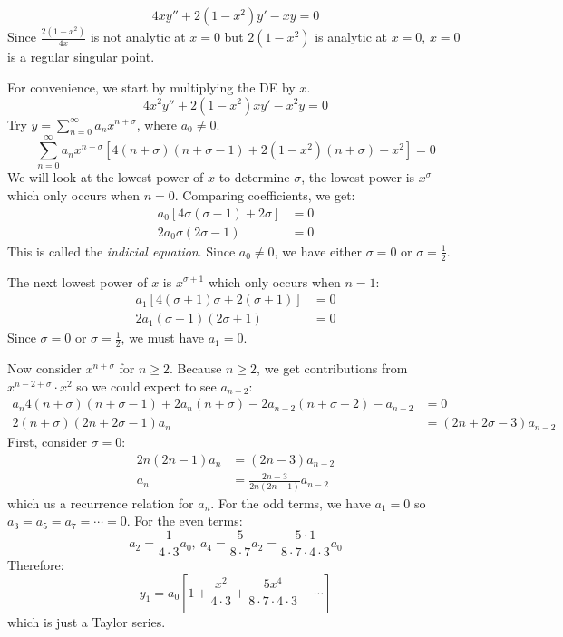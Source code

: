 \documentclass[../main.tex]{subfiles}
\begin{document}
\begin{example}
  \label{regSPEx}
  \[
    4xy'' + 2(1 - x^2)y' - xy = 0
  \]
  Since $\frac{2(1-x^2)}{4x}$ is not analytic at $x = 0$ but $2(1-x^2)$ is analytic at $x = 0$, $x = 0$ is a regular singular point.

  For convenience, we start by multiplying the DE by $x$.
  \[
    4x^2y'' + 2(1 - x^2)xy' - x^2y = 0
  \]
  Try $y=\sum_{n=0}^{\infty} a_n x^{n + \sigma}$, where $a_0 \neq 0$.
  \[
    \sum_{n=0}^{\infty} a_nx^{n + \sigma}[4\left(n + \sigma\right)(n + \sigma - 1) + 2(1-x^2)(n + \sigma) - x^2] = 0
  \]
  We will look at the lowest power of $x$ to determine $\sigma$, the lowest power is $x^{\sigma}$ which only occurs when $n = 0$.
  Comparing coefficients, we get:
  \begin{align*}
    a_0[4\sigma(\sigma - 1) + 2\sigma] &= 0  \\
    2a_0\sigma(2\sigma - 1) &= 0
  \end{align*}
  This is called the \textit{indicial equation}.
  Since $a_0 \neq 0$, we have either $\sigma = 0$ or $\sigma = \frac{1}{2}$.

  The next lowest power of $x$ is $x^{\sigma + 1}$ which only occurs when $n = 1$:
  \begin{align*}
    a_1 [4(\sigma + 1)\sigma + 2(\sigma + 1)] &= 0 \\
    2a_1(\sigma + 1) (2\sigma  + 1) &= 0
  \end{align*}
  Since $\sigma = 0$ or $\sigma = \frac{1}{2}$, we must have $a_1 = 0$.

  Now consider $x^{n + \sigma}$ for $n \geq 2$.
  Because $n \geq 2$, we get contributions from $x^{n - 2 + \sigma} \cdot x^2$ so we could expect to see $a_{n-2}$:
  \begin{align*}
    a_n4(n + \sigma)(n + \sigma - 1) + 2a_n(n + \sigma) - 2a_{n - 2}(n + \sigma - 2)- a_{n - 2} &= 0 \\
    2(n + \sigma)(2n + 2\sigma - 1)a_n &= (2n + 2\sigma - 3)a_{n - 2}
  \end{align*}
  First, consider $\sigma = 0$:
  \begin{align*}
    2n(2n - 1)a_n &= (2n - 3)a_{n -2} \\
    a_n &= \frac{2n - 3}{2n(2n -1)}a_{n-2}
  \end{align*}
  which us a recurrence relation for $a_n$.
  For the odd terms, we have $a_1 = 0$ so $a_3 = a_5 = a_7 = \cdots = 0$.
  For the even terms:
  \[
    a_2 = \frac{1}{4 \cdot 3}a_0,\ a_4 = \frac{5}{8 \cdot 7}a_2 = \frac{5 \cdot 1}{8 \cdot 7 \cdot 4 \cdot 3}a_0
  \]
  Therefore:
  \[
    y_1 = a_0\left[1 + \frac{x^2}{4\cdot3} + \frac{5x^4}{8\cdot 7 \cdot 4 \cdot 3} + \cdots\right]
  \]
  which is just a Taylor series.


\end{example}
\end{document}
